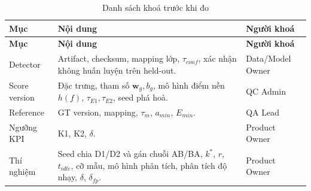 \begin{xltabular}{\linewidth}{@{}L{5.2cm}Y L{2.4cm}@{}}
\caption{Danh sách khoá trước khi đo}\label{tab:prereg}\\
\toprule
\textbf{Mục} & \textbf{Nội dung} & \textbf{Người khoá}\\
\midrule
\endfirsthead
\toprule \textbf{Mục} & \textbf{Nội dung} & \textbf{Người khoá}\\ \midrule
\endhead
\bottomrule
\endfoot
Detector & Artifact, checksum, mapping lớp, \(\tau_{conf}\), xác nhận không huấn luyện trên held-out. & Data/Model Owner\\
Score version & Đặc trưng, tham số \(\mathbf{w}_g, b_g\), mô hình điểm nền \(h(f)\), \(\tau_{E1}, \tau_{E2}\), seed phá hoà. & QC Admin\\
Reference & GT version, mapping, \(\tau_m\), \(a_{min}\), \(E_{min}\). & QA Lead\\
Ngưỡng KPI & K1, K2, \(\delta\). & Product Owner\\
Thí nghiệm & Seed chia D1/D2 và gán chuỗi AB/BA, \(k^\ast\), \(r\), \(t_{idle}\), cỡ mẫu, mô hình phân tích, phân tích độ nhạy, \(\delta\), \(\delta_{fp}\). & Product Owner\\
\end{xltabular}

